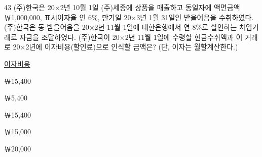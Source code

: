 \begin{question}{43}
(주)한국은 20×2년 10월 1일 (주)세종에 상품을 매출하고 동일자에 액면금액 ￦1,000,000, 표시이자율 연 6\%, 만기일 20×3년 1월 31일인 받을어음을 수취하였다. (주)한국은 동 받을어음을 20×2년 11월 1일에 대한은행에서 연 8\%로 할인하는 차입거래로 자금을 조달하였다. (주)한국이 20×2년 11월 1일에 수령할 현금수취액과 이 거래로 20×2년에 이자비용(할인료)으로 인식할 금액은? (단, 이자는 월할계산한다.) \par
\noindent\hspace*{2em}\uline{이자비용} \par
\begin{choices}
  \item {}￦15,400
  \item {}￦5,400
  \item {}￦15,400
  \item {}￦15,000
  \item {}￦20,000
\end{choices}
\end{question}
